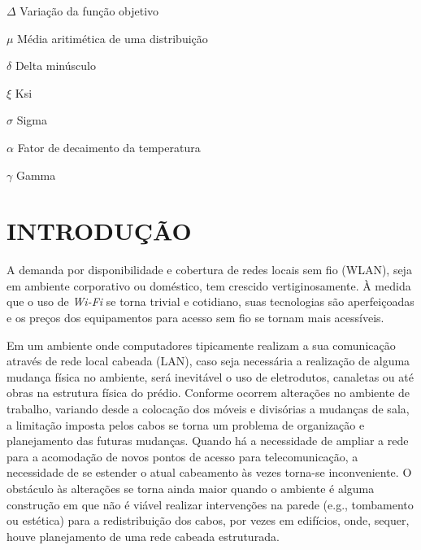 \documentclass[
	12pt,				%
	twoside,			%
	a4paper,			%
	english,			%
	french,				%
	spanish,			%
	brazil				%
	]{abntex2}
\begin{document}
\begin{simbolos}
  \item[$ \Delta $] Variação da função objetivo
  \item[$ \mu $] Média aritimética de uma distribuição
  \item[$ \delta $] Delta minúsculo
  \item[$ \xi $] Ksi
  \item[$ \sigma $] Sigma
  \item[$ \alpha $] Fator de decaimento da temperatura
  \item[$ \gamma $] Gamma
\end{simbolos}
\tableofcontents*
\cleardoublepage


\textual

\chapter{INTRODUÇÃO}\label{introduuxe7uxe3o}

A demanda por disponibilidade e cobertura de redes locais sem fio
(WLAN), seja em ambiente corporativo ou doméstico, tem crescido
vertiginosamente. À medida que o uso de \emph{Wi-Fi} se torna trivial e
cotidiano, suas tecnologias são aperfeiçoadas e os preços dos
equipamentos para acesso sem fio se tornam mais
acessíveis\cite{MARQUES}.

Em um ambiente onde computadores tipicamente realizam a sua comunicação
através de rede local cabeada (LAN), caso seja necessária a realização
de alguma mudança física no ambiente, será inevitável o uso de
eletrodutos, canaletas ou até obras na estrutura física do prédio.
Conforme ocorrem alterações no ambiente de trabalho, variando desde a
colocação dos móveis e divisórias a mudanças de sala, a limitação
imposta pelos cabos se torna um problema de organização e planejamento
das futuras mudanças. Quando há a necessidade de ampliar a rede para a
acomodação de novos pontos de acesso para telecomunicação, a necessidade
de se estender o atual cabeamento às vezes torna-se inconveniente. O
obstáculo às alterações se torna ainda maior quando o ambiente é alguma
construção em que não é viável realizar intervenções na parede (e.g.,
tombamento ou estética) para a redistribuição dos cabos, por vezes em
edifícios, onde, sequer, houve planejamento de uma rede cabeada
estruturada.
\end{document}
